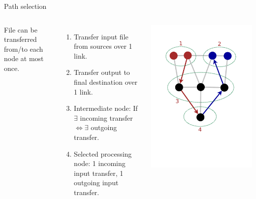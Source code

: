 \documentclass{beamer}
\begin{document}
\begin{frame}
	\begin{block}{Path selection}
\begin{columns}[c] %
File can be transferred from/to each node at most once.
\begin{enumerate}[1.]
		\item Transfer input file from sources over 1 link.
		\item Transfer output to final destination over 1 link.
		\item Intermediate node: If $\exists$ incoming transfer $\Leftrightarrow \exists$ outgoing transfer. 
		\item Selected processing node: 1 incoming input transfer, 1 outgoing input transfer.	
		\end{enumerate}
	\includegraphics [trim =30mm 70mm 30mm 30mm ,clip, width=\textwidth]{pic/link_selection.pdf}	
	\end{columns}
\end{block}
\end{frame}
\end{document}
